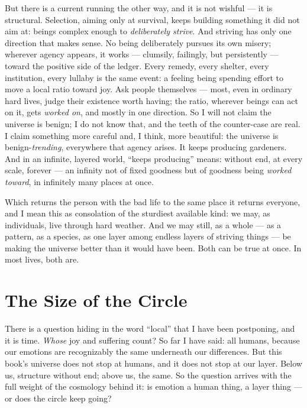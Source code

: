 \documentclass[fontsize=11pt,paper=a4,pagesize=auto,parskip=half-]{scrbook}
\newcommand\En{\centerline{\textemdash \qquad \ding{166} \qquad \textemdash}}
\begin{document}
But there is a current running the other way, and it is not wishful --- it is structural. Selection, aiming only at survival, keeps building something it did not aim at: beings complex enough to \emph{deliberately strive}. And striving has only one direction that makes sense. No being deliberately pursues its own misery; wherever agency appears, it works --- clumsily, failingly, but persistently --- toward the positive side of the ledger. Every remedy, every shelter, every institution, every lullaby is the same event: a feeling being spending effort to move a local ratio toward joy. Ask people themselves --- most, even in ordinary hard lives, judge their existence worth having; the ratio, wherever beings can act on it, gets \emph{worked on}, and mostly in one direction. So I will not claim the universe is benign; I do not know that, and the teeth of the counter-case are real. I claim something more careful and, I think, more beautiful: the universe is benign-\emph{trending}, everywhere that agency arises. It keeps producing gardeners. And in an infinite, layered world, ``keeps producing'' means: without end, at every scale, forever --- an infinity not of fixed goodness but of goodness being \emph{worked toward}, in infinitely many places at once.

Which returns the person with the bad life to the same place it returns everyone, and I mean this as consolation of the sturdiest available kind: we may, as individuals, live through hard weather. And we may still, as a whole --- as a pattern, as a species, as one layer among endless layers of striving things --- be making the universe better than it would have been. Both can be true at once. In most lives, both are.

\En

\section{The Size of the Circle}

There is a question hiding in the word ``local'' that I have been postponing, and it is time. \emph{Whose} joy and suffering count? So far I have said: all humans, because our emotions are recognizably the same underneath our differences. But this book's universe does not stop at humans, and it does not stop at our layer. Below us, structure without end; above us, the same. So the question arrives with the full weight of the cosmology behind it: is emotion a human thing, a layer thing --- or does the circle keep going?
\end{document}

